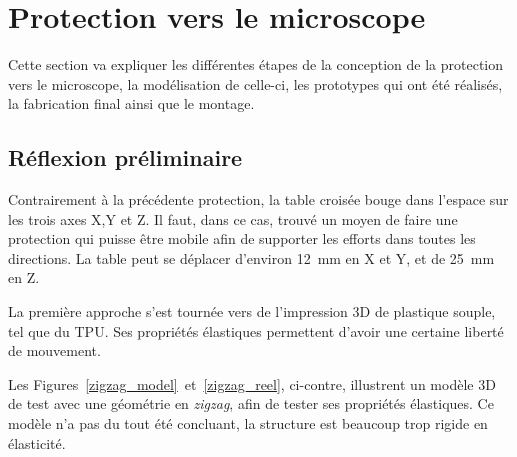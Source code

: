 \section{Protection vers le microscope}
Cette section va expliquer les différentes étapes de la conception de la protection vers le microscope, la
modélisation de celle-ci, les prototypes qui ont été réalisés, la fabrication final ainsi
que le montage.
\subsection{Réflexion préliminaire}
Contrairement à la précédente protection, la table croisée bouge dans l'espace sur les trois axes X,Y et Z. Il faut, dans ce cas, trouvé un moyen de faire une protection qui puisse être mobile afin de supporter les efforts dans toutes les directions. La table peut se déplacer d'environ 12~mm en X et Y, et de 25~mm en Z.

La première approche s'est tournée vers de l'impression 3D de plastique souple, tel que du TPU. Ses propriétés élastiques permettent d'avoir une certaine liberté de mouvement.

Les Figures~\ref{zigzag_model}~et~\ref{zigzag_reel}, ci-contre, illustrent un modèle 3D de test avec une géométrie en \textit{zigzag}, afin de tester ses propriétés élastiques. Ce modèle n'a pas du tout été concluant, la structure est beaucoup trop rigide en élasticité.

